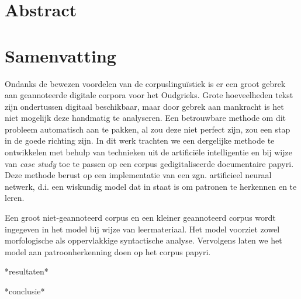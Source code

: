 
\begingroup
\let\clearpage\relax
\let\cleardoublepage\relax
\let\cleardoublepage\relax

\chapter*{Abstract}

\vfill

\chapter*{Samenvatting}

Ondanks de bewezen voordelen van de corpuslingu\"istiek is er een
groot gebrek aan geannoteerde digitale corpora voor het
Oudgrieks. Grote hoeveelheden tekst zijn ondertussen digitaal
beschikbaar, maar door gebrek aan mankracht is het niet mogelijk deze
handmatig te analyseren. Een betrouwbare methode om dit probleem
automatisch aan te pakken, al zou deze niet perfect zijn, zou een stap
in de goede richting zijn.
In dit werk trachten we een dergelijke methode te ontwikkelen met
behulp van technieken uit de artificiële intelligentie en bij wijze
van \textit{case study} toe te passen op een corpus gedigitaliseerde
documentaire papyri. Deze methode berust op een implementatie van een
zgn. artificieel neuraal netwerk, d.i. een wiskundig model dat in
staat is om patronen te herkennen en te leren. 

Een groot niet-geannoteerd corpus en een kleiner geannoteerd corpus
wordt ingegeven in het model bij wijze van leermateriaal. Het model
voorziet zowel morfologische als oppervlakkige syntactische analyse.
Vervolgens laten we het model aan patroonherkenning doen op het corpus
papyri.

*resultaten*

*conclusie*





